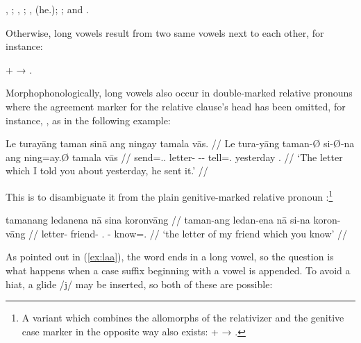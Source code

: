 \pex
	\a {}, ;
	\a {}, ;
	\a {},  (he.\Aarg{}); \label{ex:laa}
	\a {}; and 
	\a {}.\footnotemark
\xe
{}

\noindent Otherwise, long vowels result from two same vowels next to each other, 
for instance:

\ex
	 +  → 
	.\label{ex:longvwls}
\xe

Morphophonologically, long vowels also occur in double-marked relative pronouns 
where the agreement marker for the relative clause's head has been omitted,
for instance, , as in the following 
example:

\ex\begingl
	\gla Le turayāng taman sinā ang ningay tamala vās. //
	\glb Le tura-yāng taman-Ø si-Ø-na ang ning=ay.Ø tamala vās //
	\glc \PatTI{} send=\Tsg{}.\M{}.\Aarg{} letter-\Top{} \Rel{}-\PatTI{}-\Gen{} \AgtT{} tell=\Fsg{}.\Top{} yesterday \Ssg{}.\Parg{} //
	\glft `The letter which I told you about yesterday, he sent it.' //
\endgl\xe

This is to disambiguate it from the plain genitive-marked relative pronoun 
:\footnote{A variant which combines the 
allomorphs of the relativizer and the genitive case marker in the opposite way 
also exists:  +  → .}

\ex\begingl
	\gla tamanang ledanena nā sina koronvāng //
	\glb taman-ang ledan-ena nā si-na koron-vāng //
	\glc letter-\Aarg{} friend-\Gen{} \Fsg.\Gen{} \Rel{}-\Gen{} know=\Ssg{}.\Aarg{} //
	\glft `the letter of my friend which you know' //
\endgl\xe

As pointed out in (\ref{ex:laa}), the word  ends in a 
long vowel, so the question is what happens when a case suffix beginning with a 
vowel is appended. To avoid a hiat, a glide /j/ may be inserted, so both of 
these are possible:

